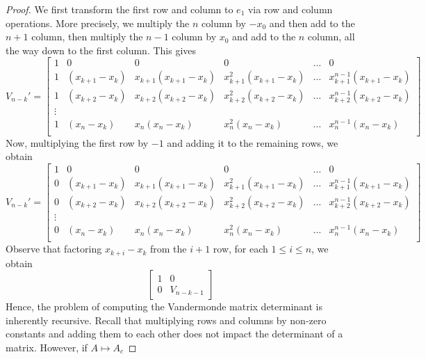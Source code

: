 \documentclass[12pt,reqno]{amsart}
\numberwithin{equation}{section}  %
\begin{document}
\begin{proof}
We first transform the first row and column to $e_1$ 
via row and column operations. More precisely, we multiply the $n$ column by $-x_0$ and then
add to the $n+1$ column, then multiply the $n-1$ column by $x_0$ and add
to the $n$ column, all the way down to the first column. This gives
\begin{equation*}
V_{n-k}' = \begin{bmatrix}
1 & 0 & 0 & 0 & \ldots  & 0 \\
1 & (x_{k+1} - x_k) & x_{k+1}(x_{k+1} - x_k) & x_{k+1}^2(x_{k+1} - x_k) & \ldots & x_{k+1}^{n-1}(x_{k+1} - x_k) \\
1 & (x_{k+2} - x_k) & x_{k+2}(x_{k+2} - x_k) & x_{k+2}^2(x_{k+2} - x_k) & \ldots & x_{k+2}^{n-1}(x_{k+2} - x_k) \\
\vdots \\
1 & (x_n - x_k) & x_n(x_n - x_k) & x_n^2(x_n - x_k) & \ldots & x_n^{n-1}(x_n - x_k) \\
\end{bmatrix}
\end{equation*}
Now, multiplying the first row by $-1$ and adding it to the remaining rows,
we obtain
\begin{equation*}
V_{n-k}' = \begin{bmatrix}
1 & 0 & 0 & 0 & \ldots & 0 \\
0 & (x_{k+1} - x_k) & x_{k+1}(x_{k+1} - x_k) & x_{k+1}^2(x_{k+1} - x_k) & \ldots & x_{k+1}^{n-1}(x_{k+1} - x_k) \\
0 & (x_{k+2} - x_k) & x_{k+2}(x_{k+2} - x_k) & x_{k+2}^2(x_{k+2} - x_k) & \ldots & x_{k+2}^{n-1}(x_{k+2} - x_k) \\
\vdots \\
0 & (x_n - x_k) & x_n(x_n - x_k) & x_n^2(x_n - x_k) & \ldots & x_n^{n-1}(x_n - x_k) \\
\end{bmatrix}
\end{equation*}
Observe that factoring $x_{k+i} -x_k$ from the $i+1$ row, for each $1 \le i \le n$, we obtain
\begin{equation*}
\begin{bmatrix}
1 & 0 \\
0 & V_{n-k-1}
\end{bmatrix}
\end{equation*}
Hence, the problem of computing the Vandermonde matrix determinant is inherently
recursive. Recall that multiplying rows and columns by non-zero constants and adding them to each
other does not impact the determinant of a matrix. However, if $A \mapsto A_c$

\end{proof}
\end{document}
